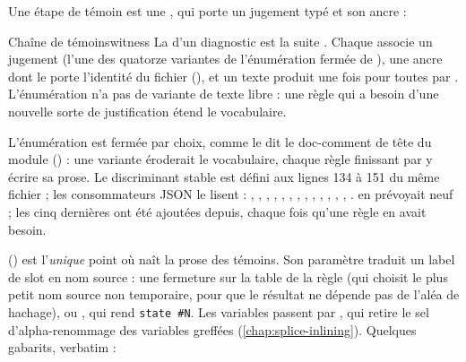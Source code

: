 Une étape de témoin est une , qui porte un jugement typé  et son ancre :



\begin{definition}{Chaîne de témoins}{witness}
La  d'un diagnostic est la suite . Chaque  associe un jugement  (l'une des quatorze variantes de l'énumération fermée de ), une ancre  dont le  porte l'identité du fichier (), et un texte  produit une fois pour toutes par . L'énumération n'a pas de variante de texte libre : une règle qui a besoin d'une nouvelle sorte de justification étend le vocabulaire.
\end{definition}

L'énumération est fermée par choix, comme le dit le doc-comment de tête du module () : une variante  éroderait le vocabulaire, chaque règle finissant par y écrire sa prose. Le discriminant stable  est défini aux lignes 134 à 151 du même fichier ; les consommateurs JSON le lisent : , , , , , , , , , , , , , .  en prévoyait neuf ; les cinq dernières ont été ajoutées depuis, chaque fois qu'une règle en avait besoin.

 () est l'\emph{unique} point où naît la prose des témoins. Son paramètre traduit un label de slot en nom source : une fermeture sur la table  de la règle (qui choisit le plus petit nom source non temporaire, pour que le résultat ne dépende pas de l'aléa de hachage), ou , qui rend \texttt{state \#N}. Les variables passent par , qui retire le sel d'alpha-renommage des variables greffées (\cref{chap:splice-inlining}). Quelques gabarits, verbatim :

